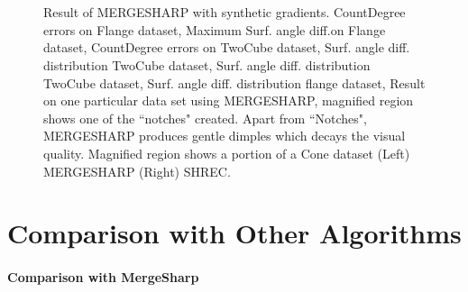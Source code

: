 \begin{figure}[p]
	\\
	\\
	\caption{Result of  MERGESHARP with synthetic gradients. 
	\protect{} CountDegree errors on Flange dataset, 
	\protect{} Maximum Surf. angle diff.on Flange dataset,
	\protect{} CountDegree errors on TwoCube dataset,
	\protect{}  Surf. angle diff. distribution TwoCube dataset,
	\protect{}  Surf. angle diff. distribution TwoCube dataset,
	\protect{} Surf. angle diff. distribution flange dataset,
	 \protect{}  Result on one particular data set using MERGESHARP, magnified region shows one of the ``notches" created.
	 \protect{}  Apart from ``Notches", MERGESHARP produces gentle dimples which decays the visual quality. Magnified region shows a portion of a Cone dataset (Left) MERGESHARP (Right) SHREC. }
	\label{fig:mergeSharpVShrec}
\end{figure}	

\section{Comparison with Other Algorithms}
\label{section:comparison}
\paragraph{Comparison with MergeSharp}

